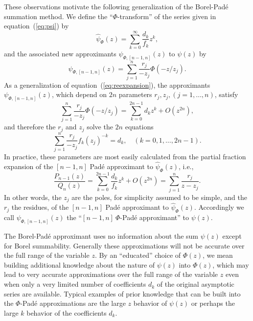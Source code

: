 \documentclass[12pt]{iopart}
\begin{document}
These observations motivate the following generalization of the Borel-Pad\'e summation method.
We define the ``$\Phi$-transform'' of the series given in equation~(\ref{eq:psi}) by
%
\begin{equation}
	\label{eq:phitrans}
	\hat{\psi}_\Phi(z) = \sum_{k=0}^\infty \frac{d_k}{f_k} z^k,
\end{equation}
%
and the associated new approximants $\psi_{\Phi,[n-1,n]}(z)$ to $\psi(z)$ by
%
\begin{equation}
	\label{eq:na}
	 \psi_{\Phi,[n-1,n]}(z) = \sum_{j=1}^n  \frac{r_j}{-z_j}  \Phi (-z/z_j).
\end{equation}	
%
As a generalization of equation~(\ref{eq:reexpansion}), the approximants $ \psi_{\Phi,[n-1,n]}(z)$,
which depend on $2n$ parameters $r_j, z_j, (j=1,\dots,n)$, satisfy
%
\begin{equation}
	 \sum_{j=1}^n  \frac{r_j}{-z_j}  \Phi (-z/z_j)
	 =
	 \sum_{k=0}^{2n-1} d_k z^k +O(z^{2n}),
\end{equation}
%
and therefore the $r_j$ and $z_j$ solve the $2n$ equations
%
\begin{equation}
	\sum_{j=1}^n \frac{r_j}{-z_j} f_k ( z_j )^{-k} = d_k , \quad(k=0,1,\ldots,2n-1).
\label{eq:match}
\end{equation}
%
In practice, these parameters are most easily calculated from the partial fraction expansion
of the $[n-1,n]$ Pad\'e approximant to $\hat{\psi}_\Phi(z)$, i.e., 
%
\begin{equation}
	\label{eq:PQ}
	\frac{P_{n-1}(z)}{Q_n(z)} = \sum_{k=0}^{2n-1} \frac{d_k}{f_k}z^k + O(z^{2n})
	=
	\sum_{j=1}^n \frac{r_j}{z-z_j}.
\end{equation}
%
In other words, the $z_j$ are the poles, for simplicity assumed to be simple, and the $r_j$ the residues,
of the $[n-1,n]$ Pad\'e approximant to $\hat{\psi}_\Phi(z)$. Accordingly we call $ \psi_{\Phi,[n-1,n]}(z)$ the
``$[n-1,n]\ \Phi$-Pad\'e approximant'' to $\psi(z)$.

The Borel-Pad\'e approximant uses no information about the sum $\psi(z)$ except for Borel summability.
Generally these approximations will not be accurate over the full range of the variable $z$.
By  an ``educated'' choice of $\Phi(z)$, we mean building additional knowledge about the nature of $\psi(z)$
into $\Phi(z)$, which may lead to very accurate approximations over the full range of the variable $z$
even when only a very limited number of coefficients $d_k$ of the original asymptotic series are available.
Typical examples of prior knowledge that can be built into the $\Phi$-Pad\'e approximations are the
large $z$ behavior of $\psi(z)$ or perhaps the large $k$ behavior of the coefficients $d_k$.
\end{document}
